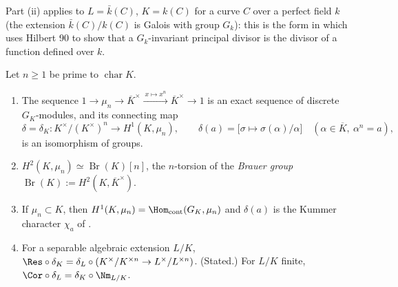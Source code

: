 \begin{remark}
Part (ii) applies to $L=\bar k(C)$, $K=k(C)$ for a curve $C$ over a perfect field $k$ (the extension $\bar k(C)/k(C)$ is Galois with group $G_k$): this is the
form in which  uses Hilbert 90 to show that a $G_k$-invariant principal divisor is the divisor of a function defined over $k$.
\end{remark}

\begin{theorem}\label{thm:galcoh:kummer}
Let $n\ge1$ be prime to $\operatorname{char}K$.
\begin{enumerate}[label=(\roman*)]
\item The sequence $1\to\mu_n\to\overline K^\times\xrightarrow{\ x\mapsto x^n\ }\overline K^\times\to1$ is an exact sequence of discrete $G_K$-modules, and its connecting map
\[
\delta=\delta_K\colon K^\times/(K^\times)^n\longrightarrow H^1(K,\mu_n),\qquad\delta(a)=\bigl[\sigma\mapsto\sigma(\alpha)/\alpha\bigr]\quad(\alpha\in\overline K,\ \alpha^n=a),
\]
is an isomorphism of groups.
\item $H^2(K,\mu_n)\simeq\operatorname{Br}(K)[n]$, the $n$-torsion of the \emph{Brauer group} $\operatorname{Br}(K):=H^2(K,\overline K^\times)$.
\item If $\mu_n\subset K$, then $H^1(K,\mu_n)=\Hom_{\mathrm{cont}}(G_K,\mu_n)$ and $\delta(a)$ is the Kummer character $\chi_a$ of .
\item For a separable algebraic extension $L/K$, $\Res\circ\delta_K=\delta_L\circ(K^\times/K^{\times n}\to L^\times/L^{\times n})$. (Stated.) For $L/K$ finite,
$\Cor\circ\delta_L=\delta_K\circ\Nm_{L/K}$.
\end{enumerate}
\end{theorem}

